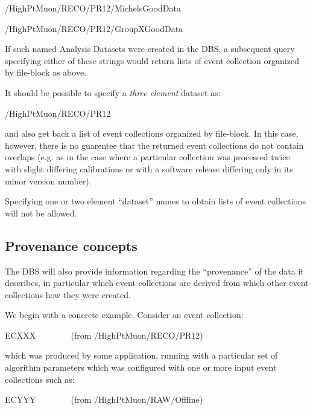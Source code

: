 \documentclass{cmspaper}
\begin{document}
\begin{center}
     \mbox{/HighPtMuon/RECO/PR12/MichelsGoodData}
\end{center}

\begin{center}
     \mbox{/HighPtMuon/RECO/PR12/GroupXGoodData}
\end{center}

If such named Analysis Datasets were created in the DBS, a subsequent query 
specifying either of these strings would return lists of event collection 
organized by file-block as above.

  It should be possible to specify a {\it three element} dataset as:

\begin{center}
     \mbox{/HighPtMuon/RECO/PR12}
\end{center}

and also get back a list of event collections organized by file-block. In
this case, however, there is no guarentee that the returned event collections
do not contain overlaps (e.g. as in the case where a particular collection
was processed twice with slight differing calibrations or with a software
release differing only in its minor version number).

  Specifying one or two element ``dataset'' names to obtain lists of event
collections will not be allowed.

\subsection{Provenance concepts}
\label{sec:prov}

  The DBS will also provide information regarding the ``provenance'' of
the data it describes, in particular which event collections are derived
from which other event collections how they were created.

  We begin with a concrete example. Consider an event collection:

\begin{center}
ECXXX ~~~~~~~ (from /HighPtMuon/RECO/PR12)
\end{center}

which was produced by some application, running with a particular set 
of algorithm parameters which was configured with one or more input event 
collections such as:
 
\begin{center}
ECYYY ~~~~~~~ (from /HighPtMuon/RAW/Offline)
\end{center}
\end{document}
